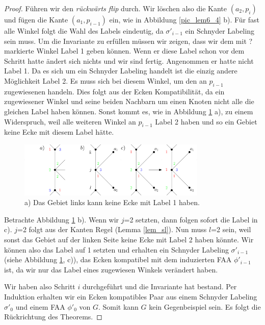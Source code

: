 \begin{proof}
Führen wir den \textit{rückwärts flip} durch. Wir löschen also die Kante $(a_2,p_i)$ und fügen die Kante $(a_1,p_{i-1})$ ein, wie in Abbildung \ref{pic_lem6_4} b). Für fast alle Winkel folgt die Wahl des Labels eindeutig, da $\sigma'_{i-1}$ ein Schnyder Labeling sein muss. Um die Invariante zu erfüllen müssen wir zeigen, dass wir dem mit ? markierte Winkel Label 1 geben können. Wenn er diese Label schon vor dem Schritt hatte ändert sich nichts und wir sind fertig. Angenommen er hatte nicht Label 1. Da es sich um ein Schnyder Labeling handelt ist die einzig andere Möglichkeit Label 2. Es muss sich bei diesem Winkel, um den an $p_{i-1}$ zugewiesenen handeln. Dies folgt aus der Ecken Kompatibilität, da ein zugewiesener Winkel und seine beiden Nachbarn um einen Knoten nicht alle die gleichen Label haben können. Sonst kommt es, wie in Abbildung \ref{pic_lem6_5} a), zu einem Widerspruch, weil alle weiteren Winkel an $p_{i-1}$ Label 2 haben und so ein Gebiet keine Ecke mit diesem Label hätte.

\begin{figure}[h]
	\centering
	  \includegraphics[width=0.8\textwidth]{lem6_5.png}
    	\caption{a) Das Gebiet links kann keine Ecke mit Label 1 haben.}
    	\label{pic_lem6_5}
\end{figure}

Betrachte Abbildung \ref{pic_lem6_5} b). Wenn wir $j$=2 setzten, dann folgen sofort die Label in c). $j$=2 folgt aus der Kanten Regel (Lemma \ref{lem_sl}). Nun muss $l$=2 sein, weil sonst das Gebiet auf der linken Seite keine Ecke mit Label 2 haben könnte. Wir können also das Label auf 1 setzten und erhalten ein Schnyder Labeling $\sigma'_{i-1}$ (siehe Abbildung \ref{pic_lem6_5}, c)), das Ecken kompatibel mit dem induzierten FAA $\phi'_{i-1}$ ist, da wir nur das Label eines zugewiesen Winkels verändert haben.

Wir haben also Schritt $i$ durchgeführt und die Invariante hat bestand. Per Induktion erhalten wir ein Ecken kompatibles Paar aus einem Schnyder Labeling $\sigma'_0$ und einem FAA $\phi'_0$ von $G$. Somit kann $G$ kein Gegenbeispiel sein. Es folgt die Rückrichtung des Theorems.
\end{proof}

